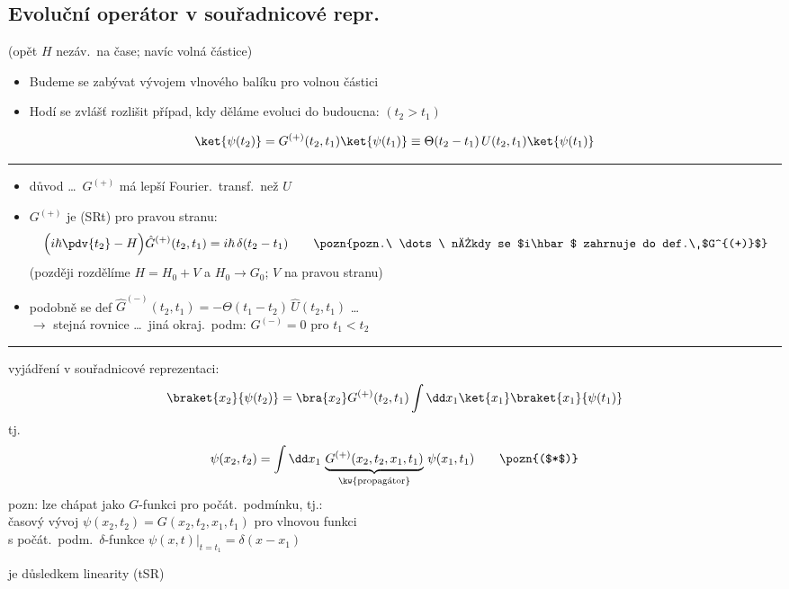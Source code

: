 \subsection{Evoluční operátor v souřadnicové repr.}
(opět $H$ nezáv.\ na čase; navíc volná částice)
\begin{itemize}[nosep]
  \item[--] Budeme se zabývat vývojem vlnového balíku pro volnou částici
  \item[--] Hodí se zvlášť rozlišit případ, kdy děláme evoluci do budoucna: \hfill $(t_2 > t_1)$
\end{itemize}
\[
  \ket{\psi(t_2)} = G^{(+)}(t_2,t_1)\ket{\psi(t_1)} \equiv \Theta(t_2-t_1)\,U(t_2,t_1)\ket{\psi(t_1)}
\]
\noindent\rule{\linewidth}{0.3pt}
\begin{itemize}
  \item důvod \dots\ $G^{(+)}$ má lepší Fourier.\ transf.\ než $U$ \hfill {}
  \item $G^{(+)}$ je  (SRt) pro pravou stranu:
  \[
    \Big(i\hbar\pdv{t_2} - H\Big)\hat G^{(+)}(t_2,t_1) = i\hbar\,\delta(t_2-t_1)
    \qquad \text{\pozn{pozn.\ \dots\ někdy se $i\hbar$ zahrnuje do def.\ $G^{(+)}$}}
  \]
  (později rozdělíme $H = H_0 + V$ a $H_0\to G_0$; $V$ na pravou stranu)
  \item podobně se def \quad $\hat G^{(-)}(t_2,t_1) = -\Theta(t_1-t_2)\,\hat U(t_2,t_1)$ \quad \dots\  \\
        $\to$ stejná rovnice \dots\ jiná okraj.\ podm: $G^{(-)} = 0$ pro $t_1 < t_2$
\end{itemize}
\noindent\rule{\linewidth}{0.3pt}

vyjádření v souřadnicové reprezentaci:
\[
  \braket{x_2}{\psi(t_2)} = \bra{x_2}G^{(+)}(t_2,t_1)\int\dd x_1\ket{x_1}\braket{x_1}{\psi(t_1)}
\]
tj.
\[
  \psi(x_2,t_2) = \int\dd x_1\,\underbrace{G^{(+)}(x_2,t_2,x_1,t_1)}_{\text{\kw{propagátor}}}\,\psi(x_1,t_1) \qquad \pozn{($*$)}
\]
pozn: lze chápat jako $G$-funkci pro počát.\ podmínku, tj.: \\
\quad časový vývoj $\psi(x_2,t_2) = G(x_2,t_2,x_1,t_1)$ pro vlnovou funkci \\
\quad s počát.\ podm.\ $\delta$-funkce \quad $\psi(x,t)\big|_{t=t_1} = \delta(x-x_1)$

\pozn{($*$)} je důsledkem linearity (tSR)

